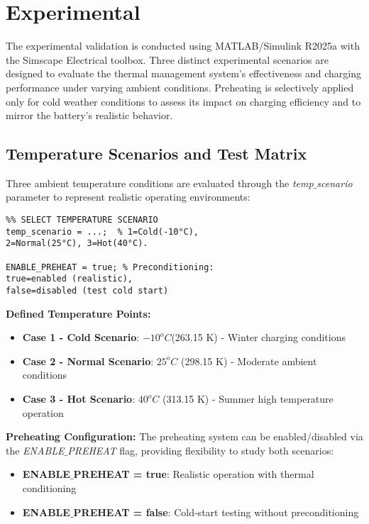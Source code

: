 \documentclass[conference]{IEEEtran}
\begin{document}
\section{\textbf{Experimental}}
The experimental validation is conducted using MATLAB/Simulink R2025a with the Simscape Electrical toolbox. Three distinct experimental scenarios are designed to evaluate the thermal management system's effectiveness and charging performance under varying ambient conditions. Preheating is selectively applied only for cold weather conditions to assess its impact on charging efficiency and to mirror the battery's realistic behavior.

\subsection {\textbf{Temperature Scenarios and Test Matrix}}

Three ambient temperature conditions are evaluated through the \textit{temp$\_$scenario} parameter to represent realistic operating environments:

\begin{verbatim}
%% SELECT TEMPERATURE SCENARIO
temp_scenario = ...;  % 1=Cold(-10°C), 
2=Normal(25°C), 3=Hot(40°C).

ENABLE_PREHEAT = true; % Preconditioning: 
true=enabled (realistic),
false=disabled (test cold start)    
\end{verbatim}

\textbf{Defined Temperature Points:}
\begin{itemize}
    \item \textbf{Case 1 - Cold Scenario}: $-10^oC$(263.15 K) - Winter charging conditions
    \item \textbf{Case 2 - Normal Scenario}: $25^oC$ (298.15 K) - Moderate ambient conditions
    \item \textbf{Case 3 - Hot Scenario}: $40^oC$ (313.15 K) - Summer high temperature operation
\end{itemize}

\textbf{Preheating Configuration:}
The preheating system can be enabled/disabled via the \textit{ENABLE$\_$PREHEAT} flag, providing flexibility to study both scenarios:

\begin{itemize}
    \item \textbf{ENABLE$\_$PREHEAT = true}: Realistic operation with thermal conditioning
    \item \textbf{ENABLE$\_$PREHEAT = false}: Cold-start testing without preconditioning
\end{itemize}
\end{document}
